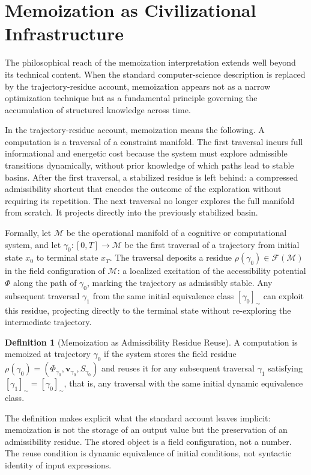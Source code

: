 \documentclass[12pt, a4paper, openany]{book}
\theoremstyle{plain}
\theoremstyle{definition}
\newtheorem{definition}[theorem]{Definition}
\theoremstyle{remark}
\newcommand{\vvec}{\mathbf{v}}
\newcommand{\Sfield}{S}
\begin{document}
\section{Memoization as Civilizational Infrastructure}

The philosophical reach of the memoization interpretation extends well beyond its technical content. When the standard computer-science description is replaced by the trajectory-residue account, memoization appears not as a narrow optimization technique but as a fundamental principle governing the accumulation of structured knowledge across time.

In the trajectory-residue account, memoization means the following. A computation is a traversal of a constraint manifold. The first traversal incurs full informational and energetic cost because the system must explore admissible transitions dynamically, without prior knowledge of which paths lead to stable basins. After the first traversal, a stabilized residue is left behind: a compressed admissibility shortcut that encodes the outcome of the exploration without requiring its repetition. The next traversal no longer explores the full manifold from scratch. It projects directly into the previously stabilized basin.

Formally, let $\mathcal{M}$ be the operational manifold of a cognitive or computational system, and let $\gamma_0: [0,T] \to \mathcal{M}$ be the first traversal of a trajectory from initial state $x_0$ to terminal state $x_T$. The traversal deposits a residue $\rho(\gamma_0) \in \mathcal{F}(\mathcal{M})$ in the field configuration of $\mathcal{M}$: a localized excitation of the accessibility potential $\Phi$ along the path of $\gamma_0$, marking the trajectory as admissibly stable. Any subsequent traversal $\gamma_1$ from the same initial equivalence class $[\gamma_0]_\sim$ can exploit this residue, projecting directly to the terminal state without re-exploring the intermediate trajectory.

\begin{definition}[Memoization as Admissibility Residue Reuse]
A computation is memoized at trajectory $\gamma_0$ if the system stores the field residue $\rho(\gamma_0) = (\Phi_{\gamma_0}, \vvec_{\gamma_0}, \Sfield_{\gamma_0})$ and reuses it for any subsequent traversal $\gamma_1$ satisfying $[\gamma_1]_\sim = [\gamma_0]_\sim$, that is, any traversal with the same initial dynamic equivalence class.
\end{definition}

The definition makes explicit what the standard account leaves implicit: memoization is not the storage of an output value but the preservation of an admissibility residue. The stored object is a field configuration, not a number. The reuse condition is dynamic equivalence of initial conditions, not syntactic identity of input expressions.
\end{document}
